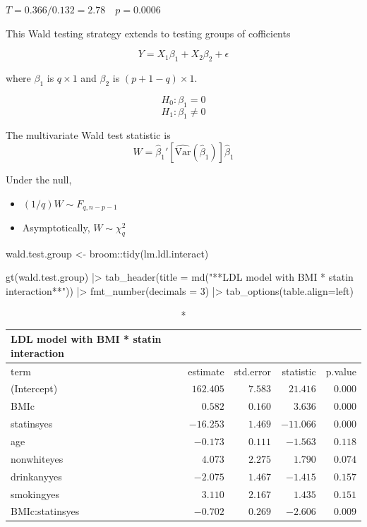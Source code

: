 \documentclass[
  letterpaper,
  DIV=11,
  numbers=noendperiod]{scrreport}
\newenvironment{Shaded}{\begin{snugshade}}{\end{snugshade}}
\newcommand{\AttributeTok}[1]{\textcolor[rgb]{0.40,0.45,0.13}{#1}}
\newcommand{\DecValTok}[1]{\textcolor[rgb]{0.68,0.00,0.00}{#1}}
\newcommand{\FunctionTok}[1]{\textcolor[rgb]{0.28,0.35,0.67}{#1}}
\newcommand{\NormalTok}[1]{\textcolor[rgb]{0.00,0.23,0.31}{#1}}
\newcommand{\OtherTok}[1]{\textcolor[rgb]{0.00,0.23,0.31}{#1}}
\newcommand{\SpecialCharTok}[1]{\textcolor[rgb]{0.37,0.37,0.37}{#1}}
\newcommand{\StringTok}[1]{\textcolor[rgb]{0.13,0.47,0.30}{#1}}
\providecommand{\tightlist}{%
  \setlength{\itemsep}{0pt}\setlength{\parskip}{0pt}}\usepackage{longtable,booktabs,array}
\begin{document}
\(T = 0.366/0.132 = 2.78 \quad p = 0.0006\)

This Wald testing strategy extends to testing groups of cofficients

\[Y = X_1 \beta_1 + X_2 \beta_2 + \epsilon\]

where \(\beta_1\) is \(q \times 1\) and \(\beta_2\) is
\((p + 1 - q) \times 1\).

\[H_0: \beta_1 = 0\] \[H_1: \beta_1 \neq 0\]

The multivariate Wald test statistic is
\[W = \hat \beta_1' \left[ \widehat{\text{Var}}(\hat \beta_1 ) \right]  \hat \beta_1\]

Under the null,

\begin{itemize}
\tightlist
\item
  \((1/q)W \sim F_{q,n-p-1}\)
\item
  Asymptotically, \(W \sim \chi_q^2\)
\end{itemize}

\begin{Shaded}
\begin{Highlighting}[]
\NormalTok{wald.test.group }\OtherTok{\textless{}{-}}\NormalTok{ broom}\SpecialCharTok{::}\FunctionTok{tidy}\NormalTok{(lm.ldl.interact)}

\FunctionTok{gt}\NormalTok{(wald.test.group) }\SpecialCharTok{|\textgreater{}} 
  \FunctionTok{tab\_header}\NormalTok{(}\AttributeTok{title =} 
               \FunctionTok{md}\NormalTok{(}\StringTok{"**LDL model with BMI * statin interaction**"}\NormalTok{)) }\SpecialCharTok{|\textgreater{}} 
  \FunctionTok{fmt\_number}\NormalTok{(}\AttributeTok{decimals =} \DecValTok{3}\NormalTok{) }\SpecialCharTok{|\textgreater{}} 
  \FunctionTok{tab\_options}\NormalTok{(}\AttributeTok{table.align=}\StringTok{\textquotesingle{}left\textquotesingle{}}\NormalTok{)}
\end{Highlighting}
\end{Shaded}

\begin{longtable}{lrrrr}
\caption*{
{\large \textbf{LDL model with BMI * statin interaction}}
} \\ 
\toprule
term & estimate & std.error & statistic & p.value \\ 
\midrule
(Intercept) & $162.405$ & $7.583$ & $21.416$ & $0.000$ \\ 
BMIc & $0.582$ & $0.160$ & $3.636$ & $0.000$ \\ 
statinsyes & $-16.253$ & $1.469$ & $-11.066$ & $0.000$ \\ 
age & $-0.173$ & $0.111$ & $-1.563$ & $0.118$ \\ 
nonwhiteyes & $4.073$ & $2.275$ & $1.790$ & $0.074$ \\ 
drinkanyyes & $-2.075$ & $1.467$ & $-1.415$ & $0.157$ \\ 
smokingyes & $3.110$ & $2.167$ & $1.435$ & $0.151$ \\ 
BMIc:statinsyes & $-0.702$ & $0.269$ & $-2.606$ & $0.009$ \\ 
\bottomrule
\end{longtable}
\end{document}
